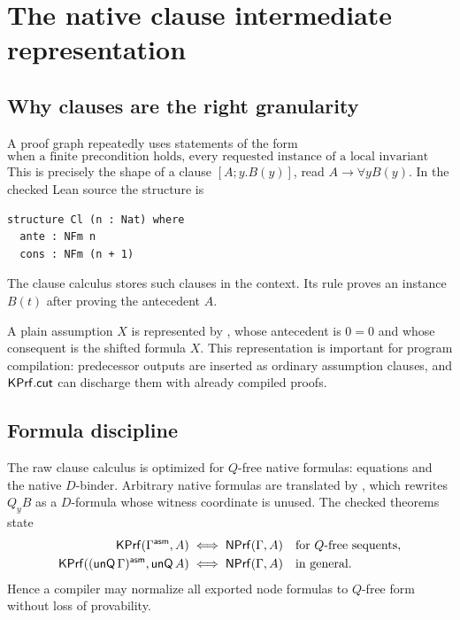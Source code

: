 \section{The native clause intermediate representation}

\subsection{Why clauses are the right granularity}

A proof graph repeatedly uses statements of the form
\[
       \text{when a finite precondition holds, every requested instance of a
       local invariant holds.}
\]
This is precisely the shape of a clause
\([A;y.B(y)]\), read \(A\to\forall y B(y)\).  In the checked Lean source the
structure is
\begin{lstlisting}[language={},caption={The upstream clause datatype, schematically}]
structure Cl (n : Nat) where
  ante : NFm n
  cons : NFm (n + 1)
\end{lstlisting}
The clause calculus stores such clauses in the context.  Its  rule
proves an instance \(B(t)\) after proving the antecedent \(A\).

A plain assumption \(X\) is represented by , whose antecedent is
\(0=0\) and whose consequent is the shifted formula \(X\).  This representation
is important for program compilation: predecessor outputs are inserted as
ordinary assumption clauses, and \(\mathsf{KPrf}.\mathsf{cut}\) can discharge them with
already compiled proofs.

\subsection{Formula discipline}

The raw clause calculus is optimized for \(Q\)-free native formulas: equations
and the native \(D\)-binder.  Arbitrary native formulas are translated by
, which rewrites \(Q_y B\) as a \(D\)-formula whose witness
coordinate is unused.  The checked theorems state
\[
\begin{aligned}
\mathsf{KPrf}(\Gamma^{\mathsf{asm}},A)&\iff\mathsf{NPrf}(\Gamma,A)
    &&\text{for \(Q\)-free sequents},\\
\mathsf{KPrf}((\mathsf{unQ}\,\Gamma)^{\mathsf{asm}},\mathsf{unQ}\,A)
    &\iff\mathsf{NPrf}(\Gamma,A)
    &&\text{in general}.
\end{aligned}
\]
Hence a compiler may normalize all exported node formulas to \(Q\)-free form
without loss of provability.

